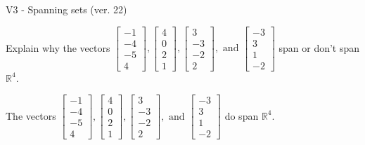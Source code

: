 \begin{exercise}
  \begin{exerciseTitle}V3 - Spanning sets (ver. 22)\end{exerciseTitle}
  \begin{exerciseStatement}
    Explain why the vectors \(\left[\begin{array}{r}
-1 \\
-4 \\
-5 \\
4
\end{array}\right] , \left[\begin{array}{r}
4 \\
0 \\
2 \\
1
\end{array}\right] , \left[\begin{array}{r}
3 \\
-3 \\
-2 \\
2
\end{array}\right] , \text{ and } \left[\begin{array}{r}
-3 \\
3 \\
1 \\
-2
\end{array}\right]\) span or don't span \(\mathbb{R}^4\). 
	


  \end{exerciseStatement}
  \begin{exerciseAnswer}
   The vectors \(\left[\begin{array}{r}
-1 \\
-4 \\
-5 \\
4
\end{array}\right] , \left[\begin{array}{r}
4 \\
0 \\
2 \\
1
\end{array}\right] , \left[\begin{array}{r}
3 \\
-3 \\
-2 \\
2
\end{array}\right] , \text{ and } \left[\begin{array}{r}
-3 \\
3 \\
1 \\
-2
\end{array}\right]\) 
  	 do  
	span \(\mathbb{R}^4\).
  


  \end{exerciseAnswer}
\end{exercise}